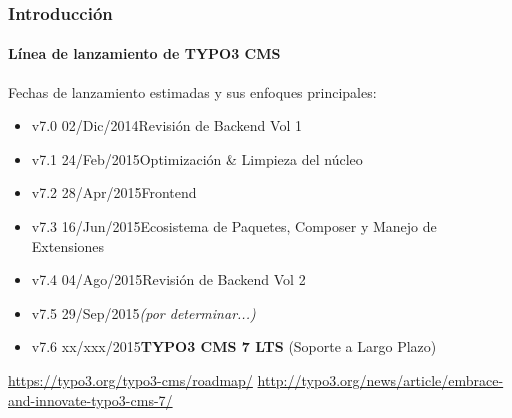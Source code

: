 \begin{frame}[fragile]
	\frametitle{Introducción}
	\framesubtitle{Línea de lanzamiento de TYPO3 CMS}

	Fechas de lanzamiento estimadas y sus enfoques principales:

	\begin{itemize}
		\item v7.0 \tabto{1.0cm}02/Dic/2014\tabto{3.4cm}Revisión de Backend Vol 1
		\item v7.1 \tabto{1.0cm}24/Feb/2015\tabto{3.4cm}Optimización \& Limpieza del núcleo
		\item v7.2 \tabto{1.0cm}28/Apr/2015\tabto{3.4cm}Frontend

		\item
			\begingroup
				\color{typo3orange}
					v7.3 \tabto{1.0cm}16/Jun/2015\tabto{3.4cm}Ecosistema de Paquetes, Composer\newline
					\tabto{3.4cm}y Manejo de Extensiones
			\endgroup

		\item v7.4 \tabto{1.0cm}04/Ago/2015\tabto{3.4cm}Revisión de Backend Vol 2
		\item v7.5 \tabto{1.0cm}29/Sep/2015\tabto{3.4cm}\textit{(por determinar...)}
		\item v7.6 \tabto{1.0cm}xx/xxx/2015\tabto{3.4cm}\textbf{TYPO3 CMS 7 LTS} (Soporte a Largo Plazo)
	\end{itemize}

	\smaller
		\url{https://typo3.org/typo3-cms/roadmap/}\newline
		\url{http://typo3.org/news/article/embrace-and-innovate-typo3-cms-7/}
	\normalsize

\end{frame}

